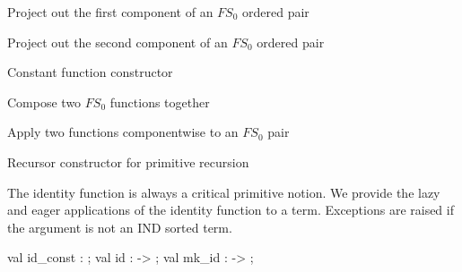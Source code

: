 \LA{}Project out the first component of an $FS_{0}$ ordered pair~{\nwtagstyle{}}\RA{}

\LA{}Project out the second component of an $FS_{0}$ ordered pair~{\nwtagstyle{}}\RA{}

\LA{}Constant function constructor~{\nwtagstyle{}}\RA{}

\LA{}Compose two $FS_{0}$ functions together~{\nwtagstyle{}}\RA{}

\LA{}Apply two functions componentwise to an $FS_{0}$ pair~{\nwtagstyle{}}\RA{}

\LA{}Recursor constructor for primitive recursion~{\nwtagstyle{}}\RA{}
\nwendcode{}\nwdocspar

\begin{node}
The identity function is always a critical primitive notion. We
provide the lazy and eager applications of the identity function to a
term. Exceptions are raised if the argument is not an {\Tt{}IND\nwendquote} sorted term.
\end{node}

\nwenddocs{}\endmoddef\nwstartdeflinemarkup{}\nwenddeflinemarkup
val id_const : ;
val id :  -> ;
val mk_id :  -> ;
\nwendcode{}\nwdocspar

